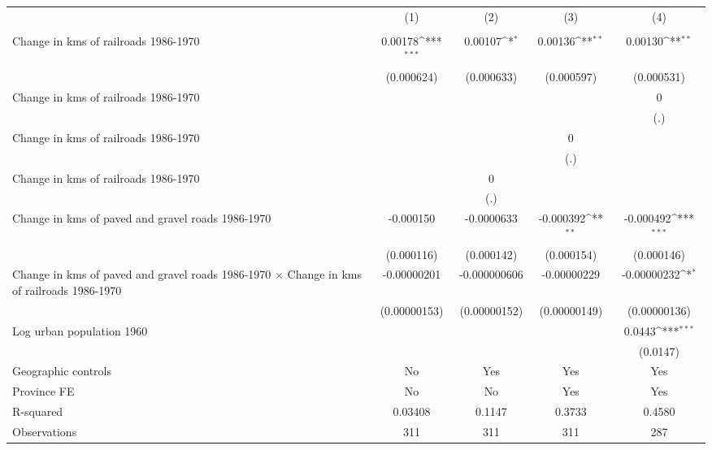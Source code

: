 {
\def\sym#1{\ifmmode^{#1}\else\(^{#1}\)\fi}
\begin{tabular}{l*{4}{c}}
\hline\hline
                &\multicolumn{1}{c}{(1)}&\multicolumn{1}{c}{(2)}&\multicolumn{1}{c}{(3)}&\multicolumn{1}{c}{(4)}\\
                &\multicolumn{1}{c}{}&\multicolumn{1}{c}{}&\multicolumn{1}{c}{}&\multicolumn{1}{c}{}\\
\hline
Change in kms of railroads 1986-1970&  0.00178\sym{***}&  0.00107\sym{*}  &  0.00136\sym{**} &  0.00130\sym{**} \\
                &(0.000624)         &(0.000633)         &(0.000597)         &(0.000531)         \\
[1em]
Change in kms of railroads 1986-1970&                  &                  &                  &        0         \\
                &                  &                  &                  &      (.)         \\
[1em]
Change in kms of railroads 1986-1970&                  &                  &        0         &                  \\
                &                  &                  &      (.)         &                  \\
[1em]
Change in kms of railroads 1986-1970&                  &        0         &                  &                  \\
                &                  &      (.)         &                  &                  \\
[1em]
Change in kms of paved and gravel roads 1986-1970&-0.000150         &-0.0000633         &-0.000392\sym{**} &-0.000492\sym{***}\\
                &(0.000116)         &(0.000142)         &(0.000154)         &(0.000146)         \\
[1em]
Change in kms of paved and gravel roads 1986-1970 $\times$ Change in kms of railroads 1986-1970&-0.00000201         &-0.000000606         &-0.00000229         &-0.00000232\sym{*}  \\
                &(0.00000153)         &(0.00000152)         &(0.00000149)         &(0.00000136)         \\
[1em]
Log urban population 1960&                  &                  &                  &   0.0443\sym{***}\\
                &                  &                  &                  & (0.0147)         \\
\hline
Geographic controls&       No         &      Yes         &      Yes         &      Yes         \\
Province FE     &       No         &       No         &      Yes         &      Yes         \\
R-squared       &  0.03408         &   0.1147         &   0.3733         &   0.4580         \\
Observations    &      311         &      311         &      311         &      287         \\
\hline\hline
\end{tabular}
}
